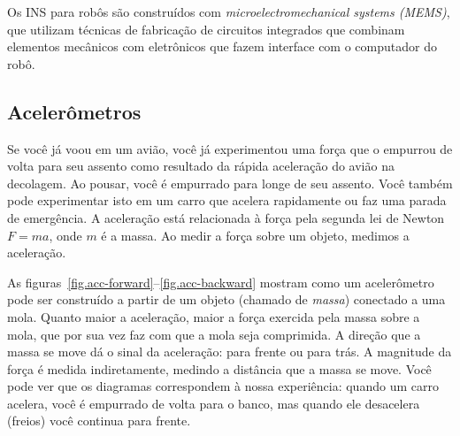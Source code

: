 Os INS para robôs são construídos com \emph{microelectromechanical systems (MEMS)}, que utilizam técnicas de fabricação de circuitos integrados que combinam elementos mecânicos com eletrônicos que fazem interface com o computador do robô.

\subsection{Acelerômetros}\label{s.accelerometer}

Se você já voou em um avião, você já experimentou uma força que o empurrou de volta para seu assento como resultado da rápida aceleração do avião na decolagem. Ao pousar, você é empurrado para longe de seu assento. Você também pode experimentar isto em um carro que acelera rapidamente ou faz uma parada de emergência. A aceleração está relacionada à força pela segunda lei de Newton $F=ma$, onde $m$ é a massa. Ao medir a força sobre um objeto, medimos a aceleração.

As figuras~\ref{fig.acc-forward}--\ref{fig.acc-backward} mostram como um acelerômetro pode ser construído a partir de um objeto (chamado de \emph{massa}) conectado a uma mola. Quanto maior a aceleração, maior a força exercida pela massa sobre a mola, que por sua vez faz com que a mola seja comprimida. A direção que a massa se move dá o sinal da aceleração: para frente ou para trás. A magnitude da força é medida indiretamente, medindo a distância que a massa se move. Você pode ver que os diagramas correspondem à nossa experiência: quando um carro acelera, você é empurrado de volta para o banco, mas quando ele desacelera (freios) você continua para frente.

